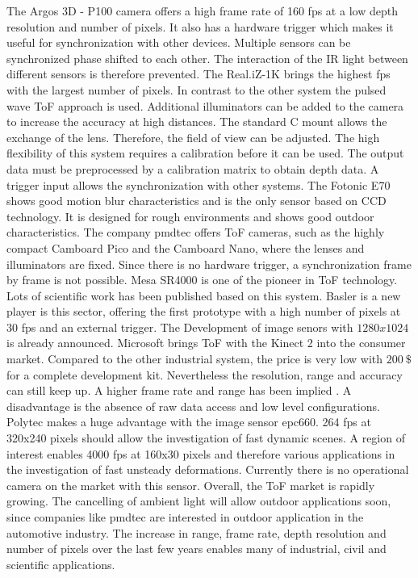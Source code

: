  The Argos 3D - P100 camera offers a high frame rate of 160 fps at a low depth resolution and number of pixels. It also has a hardware trigger which makes it useful for synchronization with other devices. Multiple sensors can be synchronized phase shifted to each other. The interaction of the IR light between different sensors is therefore prevented. The Real.iZ-1K brings the highest fps with the largest number of pixels. In contrast to the other system the pulsed wave ToF approach is used. Additional illuminators can be added to the camera to increase the accuracy at high distances. The standard C mount allows the exchange of the lens. Therefore, the field of view can be adjusted. The high flexibility of this system requires a calibration before it can be used. The output data must be preprocessed by a calibration matrix to obtain depth data. A trigger input allows the synchronization with other systems. The Fotonic E70 shows good motion blur characteristics and is the only sensor based on CCD technology. It is designed for rough environments and shows good outdoor characteristics. The company pmdtec offers ToF cameras, such as the highly compact Camboard Pico and the Camboard Nano, where the lenses and illuminators are fixed. Since there is no hardware trigger, a synchronization frame by frame is not possible. Mesa SR4000 is one of the pioneer in ToF technology. Lots of scientific work has been published based on this system. Basler is a new player is this sector, offering the first prototype with a high number of pixels at 30 fps and an external trigger. The Development of image senors with $1280x1024$ is already announced. Microsoft brings ToF with the Kinect 2 into the consumer market. Compared to the other industrial system, the price is very low with $200~\$$ for a complete development kit. Nevertheless the resolution, range and accuracy can still keep up. A higher frame rate and range has been implied \cite{payne20147} \cite{sell2014xbox}. A disadvantage is the absence of raw data access and low level configurations. Polytec makes a huge advantage with the image sensor epc660. 264 fps at 320x240 pixels should allow the investigation of fast dynamic scenes. A region of interest enables 4000 fps at 160x30 pixels and therefore various applications in the investigation of fast unsteady deformations. Currently there is no operational camera on the market with this sensor. Overall, the ToF market is rapidly growing. The cancelling of ambient light will allow outdoor applications soon, since companies like pmdtec are interested in outdoor application in the automotive industry. The increase in range, frame rate, depth resolution and number of pixels over the last few years enables many of industrial, civil and scientific applications. 

